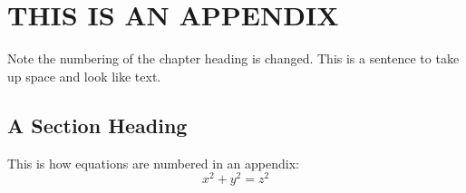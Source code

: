 \documentclass{thesis}
\begin{document}
\appendix    %
\chapter{THIS IS AN APPENDIX}
Note the numbering of the chapter heading is changed.
This is a sentence to take up space and look like text.
\section{A Section Heading}
This is how equations are numbered in an appendix:
\begin{equation}
x^2 + y^2 = z^2
\end{equation} 

\end{document}
